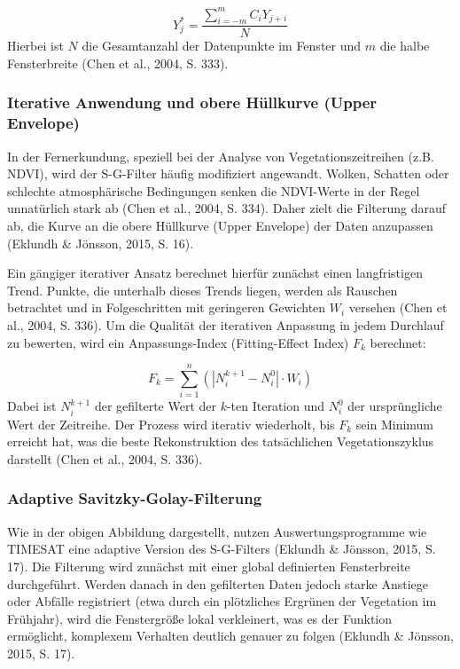 \documentclass[11pt]{report}
\begin{document}
\begin{equation}
Y_j^* = \frac{\sum_{i=-m}^{m} C_i Y_{j+i}}{N}
\end{equation}
Hierbei ist $N$ die Gesamtanzahl der Datenpunkte im Fenster und $m$ die halbe Fensterbreite (Chen et al., 2004, S. 333).

\subsubsection{Iterative Anwendung und obere Hüllkurve (Upper Envelope)}
In der Fernerkundung, speziell bei der Analyse von Vegetationszeitreihen (z.B. NDVI), wird der S-G-Filter häufig modifiziert angewandt. Wolken, Schatten oder schlechte atmosphärische Bedingungen senken die NDVI-Werte in der Regel unnatürlich stark ab (Chen et al., 2004, S. 334). Daher zielt die Filterung darauf ab, die Kurve an die obere Hüllkurve (Upper Envelope) der Daten anzupassen (Eklundh \& Jönsson, 2015, S. 16).

Ein gängiger iterativer Ansatz berechnet hierfür zunächst einen langfristigen Trend. Punkte, die unterhalb dieses Trends liegen, werden als Rauschen betrachtet und in Folgeschritten mit geringeren Gewichten $W_i$ versehen (Chen et al., 2004, S. 336). Um die Qualität der iterativen Anpassung in jedem Durchlauf zu bewerten, wird ein Anpassungs-Index (Fitting-Effect Index) $F_k$ berechnet:

\begin{equation}
F_k = \sum_{i=1}^{n} \left( \left| N_i^{k+1} - N_i^0 \right| \cdot W_i \right)
\end{equation}
Dabei ist $N_i^{k+1}$ der gefilterte Wert der $k$-ten Iteration und $N_i^0$ der ursprüngliche Wert der Zeitreihe. Der Prozess wird iterativ wiederholt, bis $F_k$ sein Minimum erreicht hat, was die beste Rekonstruktion des tatsächlichen Vegetationszyklus darstellt (Chen et al., 2004, S. 336).

\subsubsection{Adaptive Savitzky-Golay-Filterung}
Wie in der obigen Abbildung dargestellt, nutzen Auswertungsprogramme wie TIMESAT eine adaptive Version des S-G-Filters (Eklundh \& Jönsson, 2015, S. 17). Die Filterung wird zunächst mit einer global definierten Fensterbreite durchgeführt. Werden danach in den gefilterten Daten jedoch starke Anstiege oder Abfälle registriert (etwa durch ein plötzliches Ergrünen der Vegetation im Frühjahr), wird die Fenstergröße lokal verkleinert, was es der Funktion ermöglicht, komplexem Verhalten deutlich genauer zu folgen (Eklundh \& Jönsson, 2015, S. 17). 
\end{document}

